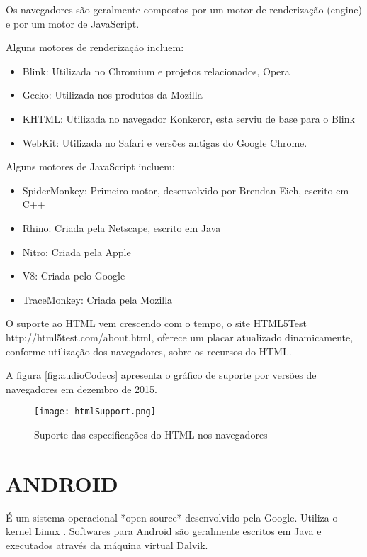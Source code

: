 Os navegadores são geralmente compostos por um motor de renderização (engine)
e por um motor de JavaScript.

Alguns motores de renderização incluem:

\begin{itemize}
    \item Blink: Utilizada no Chromium e projetos relacionados, Opera
    \item Gecko: Utilizada nos produtos da Mozilla
    \item KHTML: Utilizada no navegador Konkeror, esta serviu de base para o Blink
    \item WebKit: Utilizada no Safari e versões antigas do Google Chrome.
\end{itemize}

Alguns motores de JavaScript incluem:

\begin{itemize}
    \item SpiderMonkey: Primeiro motor, desenvolvido por Brendan Eich, escrito em C++
    \item Rhino: Criada pela Netscape, escrito em Java
    \item Nitro: Criada pela Apple
    \item V8: Criada pelo Google
    \item TraceMonkey: Criada pela Mozilla
\end{itemize}

O suporte ao HTML vem crescendo com o tempo, o site HTML5Test
http://html5test.com/about.html, oferece um placar atualizado
dinamicamente, conforme utilização dos navegadores, sobre os recursos
do HTML.

A figura \ref{fig:audioCodecs} apresenta o gráfico de suporte por versões de navegadores em dezembro de 2015.

\begin{figure}
    \centering
    \texttt{[image: htmlSupport.png]}
	\caption{Suporte das especificações do HTML nos navegadores}
    \label{fig:htmlSupport}
\end{figure}

\section{ANDROID}

É um sistema operacional *open-source* desenvolvido pela Google.
Utiliza o kernel Linux .
Softwares para Android são geralmente escritos em Java e executados
através da máquina virtual Dalvik.

